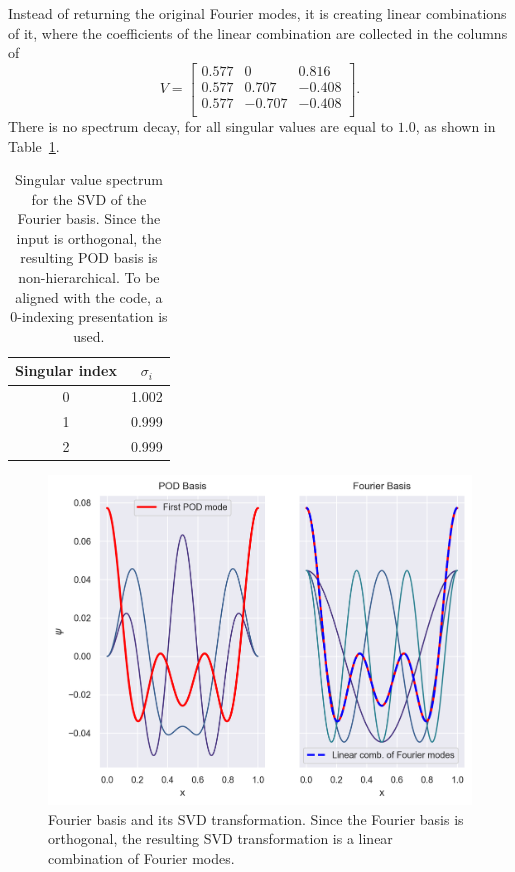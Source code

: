 \documentclass[../../thesis.tex]{subfiles}
\begin{document}
Instead of returning the original Fourier modes, 
it is creating linear combinations of it, 
where the coefficients of the linear combination are collected in the columns of
\begin{equation}
    V = \begin{bmatrix}
        0.577 &  0     &  0.816 \\
        0.577 &  0.707 & -0.408 \\
        0.577 & -0.707 & -0.408 \\
    \end{bmatrix}.
\end{equation}
There is no spectrum decay, for all singular values are equal to $1.0$,
as shown in Table~\ref{tab:appendix_fourier_spectrum}.
\begin{table}[h]
    \centering
    \caption{Singular value spectrum for the SVD of the Fourier basis.
    Since the input is orthogonal, the resulting POD basis is non-hierarchical.
    To be aligned with the code, a 0-indexing presentation is used.}
    \begin{tabular}{cc}
        \toprule
        Singular index & $\sigma_i$ \\
        \midrule
        0 &  1.002 \\
        1 &  0.999 \\
        2 &  0.999 \\
        \bottomrule
    \end{tabular}
    \label{tab:appendix_fourier_spectrum}
\end{table}

\begin{figure}[h]
    \includegraphics[width=\columnwidth]{research_project/piston/figures/svd_fourier/fourier_pod_bases.png}
    \caption{Fourier basis and its SVD transformation. 
    Since the Fourier basis is orthogonal, 
    the resulting SVD transformation is a linear combination of Fourier modes.}
\end{figure}
\end{document}
